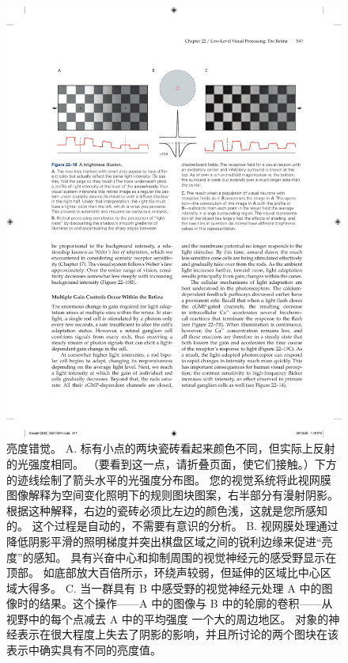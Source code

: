 \begin{figure}[htbp]
	\centering
	\includegraphics[width=1.0\linewidth]{chap22/fig_22_18}
	\caption{亮度错觉。 
		A. 标有小点的两块瓷砖看起来颜色不同，但实际上反射的光强度相同。 （要看到这一点，请折叠页面，使它们接触。）下方的迹线绘制了箭头水平的光强度分布图。 
		您的视觉系统将此视网膜图像解释为空间变化照明下的规则图块图案，右半部分有漫射阴影。 
		根据这种解释，右边的瓷砖必须比左边的颜色浅，这就是您所感知的。 这个过程是自动的，不需要有意识的分析。 
		B. 视网膜处理通过降低阴影平滑的照明梯度并突出棋盘区域之间的锐利边缘来促进“亮度”的感知。 
		具有兴奋中心和抑制周围的视觉神经元的感受野显示在顶部。 
		如底部放大百倍所示，环绕声较弱，但延伸的区域比中心区域大得多。 
		C. 当一群具有 B 中感受野的视觉神经元处理 A 中的图像时的结果。这个操作——A 中的图像与 B 中的轮廓的卷积——从视野中的每个点减去 A 中的平均强度 一个大的周边地区。 
		对象的神经表示在很大程度上失去了阴影的影响，并且所讨论的两个图块在该表示中确实具有不同的亮度值。}
	\label{fig:22_18}
\end{figure}


